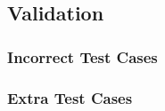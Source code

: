 \subsection{Validation}


\subsubsection{Incorrect Test Cases}

% 

\subsubsection{Extra Test Cases}

% 
